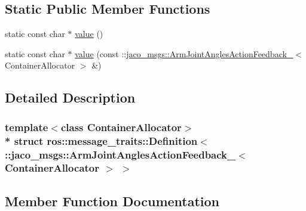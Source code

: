 \subsection*{Static Public Member Functions}
\begin{DoxyCompactItemize}
\item 
static const char $\ast$ \hyperlink{structros_1_1message__traits_1_1Definition_3_01_1_1jaco__msgs_1_1ArmJointAnglesActionFeedback___f7a0265498d8f0c8bfa24eb4de39e338_a3440186e3fd0a8ef3d16e5ec61924799}{value} ()
\item 
static const char $\ast$ \hyperlink{structros_1_1message__traits_1_1Definition_3_01_1_1jaco__msgs_1_1ArmJointAnglesActionFeedback___f7a0265498d8f0c8bfa24eb4de39e338_a6fde77298bae60d3d4230aed7579b5ed}{value} (const \+::\hyperlink{structjaco__msgs_1_1ArmJointAnglesActionFeedback__}{jaco\+\_\+msgs\+::\+Arm\+Joint\+Angles\+Action\+Feedback\+\_\+}$<$ Container\+Allocator $>$ \&)
\end{DoxyCompactItemize}


\subsection{Detailed Description}
\subsubsection*{template$<$class Container\+Allocator$>$\\*
struct ros\+::message\+\_\+traits\+::\+Definition$<$ \+::jaco\+\_\+msgs\+::\+Arm\+Joint\+Angles\+Action\+Feedback\+\_\+$<$ Container\+Allocator $>$ $>$}



\subsection{Member Function Documentation}
